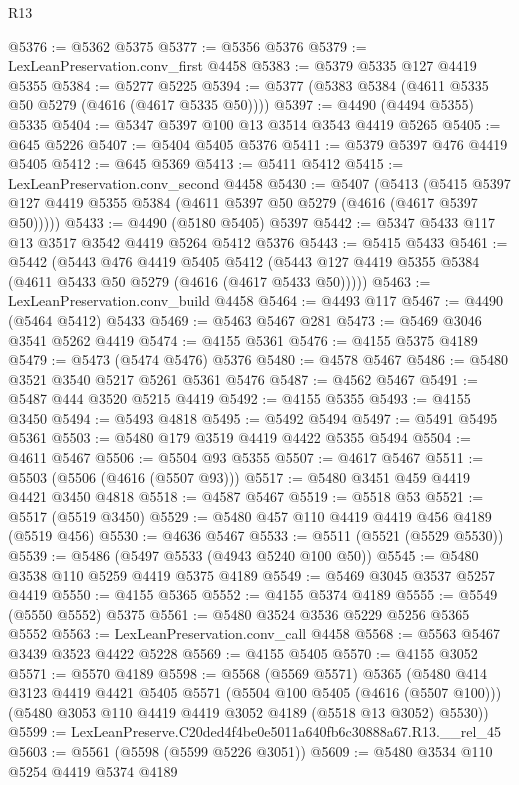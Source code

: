 \begin{lexlean}{R13}
\begin{coremodule}
@5376 := @5362 @5375
@5377 := @5356 @5376
@5379 := LexLeanPreservation.conv_first @4458
@5383 := @5379 @5335 @127 @4419 @5355
@5384 := @5277 @5225
@5394 := @5377 (@5383 @5384 (@4611 @5335 @50 @5279 (@4616 (@4617 @5335 @50))))
@5397 := @4490 (@4494 @5355) @5335
@5404 := @5347 @5397 @100 @13 @3514 @3543 @4419 @5265
@5405 := @645 @5226
@5407 := @5404 @5405 @5376
@5411 := @5379 @5397 @476 @4419 @5405
@5412 := @645 @5369
@5413 := @5411 @5412
@5415 := LexLeanPreservation.conv_second @4458
@5430 := @5407
    (@5413 (@5415 @5397 @127 @4419 @5355 @5384 (@4611 @5397 @50 @5279 (@4616 (@4617 @5397 @50)))))
@5433 := @4490 (@5180 @5405) @5397
@5442 := @5347 @5433 @117 @13 @3517 @3542 @4419 @5264 @5412 @5376
@5443 := @5415 @5433
@5461 := @5442
    (@5443
      @476
      @4419
      @5405
      @5412
      (@5443 @127 @4419 @5355 @5384 (@4611 @5433 @50 @5279 (@4616 (@4617 @5433 @50)))))
@5463 := LexLeanPreservation.conv_build @4458
@5464 := @4493 @117
@5467 := @4490 (@5464 @5412) @5433
@5469 := @5463 @5467 @281
@5473 := @5469 @3046 @3541 @5262 @4419
@5474 := @4155 @5361
@5476 := @4155 @5375 @4189
@5479 := @5473 (@5474 @5476) @5376
@5480 := @4578 @5467
@5486 := @5480 @3521 @3540 @5217 @5261 @5361 @5476
@5487 := @4562 @5467
@5491 := @5487 @444 @3520 @5215 @4419
@5492 := @4155 @5355
@5493 := @4155 @3450
@5494 := @5493 @4818
@5495 := @5492 @5494
@5497 := @5491 @5495 @5361
@5503 := @5480 @179 @3519 @4419 @4422 @5355 @5494
@5504 := @4611 @5467
@5506 := @5504 @93 @5355
@5507 := @4617 @5467
@5511 := @5503 (@5506 (@4616 (@5507 @93)))
@5517 := @5480 @3451 @459 @4419 @4421 @3450 @4818
@5518 := @4587 @5467
@5519 := @5518 @53
@5521 := @5517 (@5519 @3450)
@5529 := @5480 @457 @110 @4419 @4419 @456 @4189 (@5519 @456)
@5530 := @4636 @5467
@5533 := @5511 (@5521 (@5529 @5530))
@5539 := @5486 (@5497 @5533 (@4943 @5240 @100 @50))
@5545 := @5480 @3538 @110 @5259 @4419 @5375 @4189
@5549 := @5469 @3045 @3537 @5257 @4419
@5550 := @4155 @5365
@5552 := @4155 @5374 @4189
@5555 := @5549 (@5550 @5552) @5375
@5561 := @5480 @3524 @3536 @5229 @5256 @5365 @5552
@5563 := LexLeanPreservation.conv_call @4458
@5568 := @5563 @5467 @3439 @3523 @4422 @5228
@5569 := @4155 @5405
@5570 := @4155 @3052
@5571 := @5570 @4189
@5598 := @5568
    (@5569 @5571)
    @5365
    (@5480
      @414
      @3123
      @4419
      @4421
      @5405
      @5571
      (@5504 @100 @5405 (@4616 (@5507 @100)))
      (@5480 @3053 @110 @4419 @4419 @3052 @4189 (@5518 @13 @3052) @5530))
@5599 := LexLeanPreserve.C20ded4f4be0e5011a640fb6c30888a67.R13.__rel_45
@5603 := @5561 (@5598 (@5599 @5226 @3051))
@5609 := @5480 @3534 @110 @5254 @4419 @5374 @4189

\end{coremodule}
\end{lexlean}
